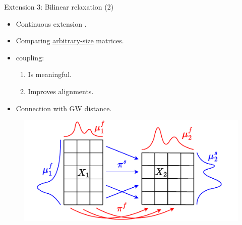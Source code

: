 \documentclass{beamer}
\begin{document}
\begin{frame}{Extension 3: Bilinear relaxation (2)}
\vspace{-0.5cm}
\begin{minipage}[t]{0.6\linewidth}
  \begin{itemize}
    \item[$\bullet$] Continuous extension \parencite{Chowdhury21b}.
    \item[$\bullet$] Comparing \underline{arbitrary-size} matrices.
    \item[$\bullet$] {\color{red}{Feature}} coupling:
    \begin{enumerate}
      \scriptsize
      \setlength\itemindent{10pt}
      \item[1.] Is meaningful.
      \item[2.] Improves {\color{blue}{sample}} alignments.
    \end{enumerate}
    \item[$\bullet$] Connection with GW distance.
  \end{itemize}
  \end{minipage}%
  \hfill%
  \hspace{-6cm}
  \begin{minipage}[t]{0.55\linewidth}
    \vspace{0.2cm}
  \begin{figure}
    \centering
    \includegraphics[width=1.2\linewidth, keepaspectratio=true]{OT_new/coot_matrix_ot.pdf}
  \end{figure}
\end{minipage}

\end{frame}
\end{document}
